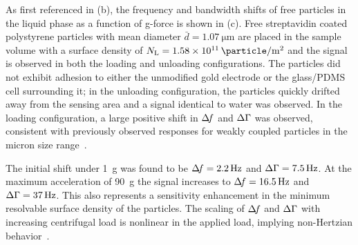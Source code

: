 As first referenced in (b), the frequency and
bandwidth shifts of free particles in the liquid phase as a function of
g-force is shown in (c).  Free streptavidin coated
polystyrene particles with mean diameter $\bar{d}=\SI{1.07}{\micro\meter}$
are placed in the sample volume with a surface density of
$N_\mathrm{L}=\SI{1.58e11}{\particle\per\meter\squared}$ and the signal is
observed in both the loading and unloading configurations.  The particles
did not exhibit adhesion to either the unmodified gold electrode or the
glass/PDMS cell surrounding it; in the unloading configuration, the
particles quickly drifted away from the sensing area and a signal identical
to water was observed.  In the loading configuration, a large positive
shift in $\Delta\!f$ and $\Delta\Gamma$ was observed, consistent with previously observed
responses for weakly coupled particles in the micron size
range~\cite{johannsman2007contacts}.  


The initial shift under \SI{1}{g} was found to be $\Delta\!f= \SI{2.2}{\hertz}$
and $\Delta\Gamma=\SI{7.5}{\hertz}$.  At the maximum acceleration of \SI{90}{g} the
signal increases to $\Delta\!f = \SI{16.5}{\hertz}$ and $\Delta\Gamma=\SI{37}{\hertz}$.
This also represents a sensitivity enhancement in the minimum resolvable
surface density of the particles.  The scaling of $\Delta\!f$ and $\Delta\Gamma$ with
increasing centrifugal load is nonlinear in the applied load, implying
non-Hertzian behavior~\cite{borovsky2001measuring}.

